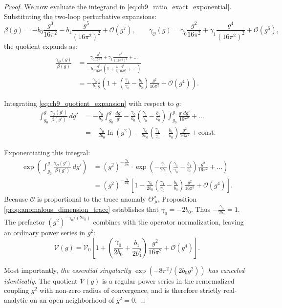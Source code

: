 \begin{proof}
We now evaluate the integrand in \eqref{eq:ch9_ratio_exact_exponential}. Substituting the two-loop perturbative expansions:
\begin{equation}
\beta(g) = -b_0 \frac{g^3}{16\pi^2} - b_1 \frac{g^5}{(16\pi^2)^2} + \mathcal{O}(g^7), \qquad \gamma_{\mathcal{O}}(g) = \gamma_0 \frac{g^2}{16\pi^2} + \gamma_1 \frac{g^4}{(16\pi^2)^2} + \mathcal{O}(g^6),
\end{equation}
the quotient expands as:
\begin{align}
\label{eq:ch9_quotient_expansion}
\frac{\gamma_{\mathcal{O}}(g)}{\beta(g)} &= \frac{\gamma_0 \frac{g^2}{16\pi^2} + \gamma_1 \frac{g^4}{(16\pi^2)^2} + \dots}{-b_0 \frac{g^3}{16\pi^2} \left( 1 + \frac{b_1}{b_0} \frac{g^2}{16\pi^2} + \dots \right)} \nonumber \\
&= -\frac{\gamma_0}{b_0} \frac{1}{g} \left( 1 + \left( \frac{\gamma_1}{\gamma_0} - \frac{b_1}{b_0} \right) \frac{g^2}{16\pi^2} + \mathcal{O}(g^4) \right).
\end{align}

Integrating \eqref{eq:ch9_quotient_expansion} with respect to $g$:
\begin{align}
\int_{g_0}^g \frac{\gamma_{\mathcal{O}}(g')}{\beta(g')} \, dg' &= -\frac{\gamma_0}{b_0} \int_{g_0}^g \frac{dg'}{g'} - \frac{\gamma_0}{b_0} \left( \frac{\gamma_1}{\gamma_0} - \frac{b_1}{b_0} \right) \int_{g_0}^g \frac{g' \, dg'}{16\pi^2} + \dots \nonumber \\
&= -\frac{\gamma_0}{2 b_0} \ln(g^2) - \frac{\gamma_0}{2 b_0} \left( \frac{\gamma_1}{\gamma_0} - \frac{b_1}{b_0} \right) \frac{g^2}{16\pi^2} + \text{const}.
\end{align}

Exponentiating this integral:
\begin{align}
\exp\left( \int_{g_0}^g \frac{\gamma_{\mathcal{O}}(g')}{\beta(g')} \, dg' \right) &= (g^2)^{-\frac{\gamma_0}{2b_0}} \cdot \exp\left( -\frac{\gamma_0}{2 b_0} \left( \frac{\gamma_1}{\gamma_0} - \frac{b_1}{b_0} \right) \frac{g^2}{16\pi^2} + \dots \right) \nonumber \\
&= (g^2)^{-\frac{\gamma_0}{2b_0}} \left[ 1 - \frac{\gamma_0}{2 b_0} \left( \frac{\gamma_1}{\gamma_0} - \frac{b_1}{b_0} \right) \frac{g^2}{16\pi^2} + \mathcal{O}(g^4) \right].
\end{align}
Because $\mathcal{O}$ is proportional to the trace anomaly $\Theta^\mu_{\ \mu}$, Proposition \ref{prop:anomalous_dimension_trace} establishes that $\gamma_0 = -2b_0$. Thus $-\frac{\gamma_0}{2b_0} = 1$. The prefactor $(g^2)^{-\gamma_0/(2b_0)}$ combines with the operator normalization, leaving an ordinary power series in $g^2$:
\begin{equation}
\mathcal{V}(g) = \mathcal{V}_0 \left[ 1 + \left( \frac{\gamma_0}{2b_0} + \frac{b_1}{2b_0^2} \right) \frac{g^2}{16\pi^2} + \mathcal{O}(g^4) \right].
\end{equation}

Most importantly, \emph{the essential singularity $\exp(-8\pi^2/(2b_0 g^2))$ has canceled identically}. The quotient $\mathcal{V}(g)$ is a regular power series in the renormalized coupling $g^2$ with non-zero radius of convergence, and is therefore strictly real-analytic on an open neighborhood of $g^2 = 0$.
\end{proof}

